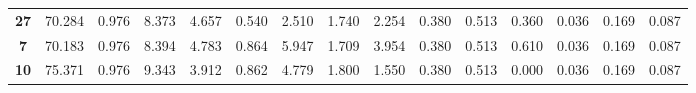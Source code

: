 \documentclass[withoutpreface,bwprint]{cumcmthesis} %
\begin{document}
\begin{appendices}
\begin{table}[!h]
\begin{tabular}{@{}ccccccccccccccc@{}}
			\textbf{27}                                               & 70.284                                                         & 0.976                                                         & 8.373                                                        & 4.657                                                        & 0.540                                                        & 2.510                                                          & 1.740                                                          & 2.254                                                        & 0.380                                                        & 0.513                                                        & 0.360                                                           & 0.036                                                        & 0.169                                                         & 0.087                                                         \\
			\textbf{7}                                                & 70.183                                                         & 0.976                                                         & 8.394                                                        & 4.783                                                        & 0.864                                                        & 5.947                                                          & 1.709                                                          & 3.954                                                        & 0.380                                                        & 0.513                                                        & 0.610                                                           & 0.036                                                        & 0.169                                                         & 0.087                                                         \\
			\textbf{10}                                               & 75.371                                                         & 0.976                                                         & 9.343                                                        & 3.912                                                        & 0.862                                                        & 4.779                                                          & 1.800                                                          & 1.550                                                        & 0.380                                                        & 0.513                                                        & 0.000                                                           & 0.036                                                        & 0.169                                                         & 0.087                                                         \\ \bottomrule
		\end{tabular}
	\end{table}


\end{appendices}
\end{document}
